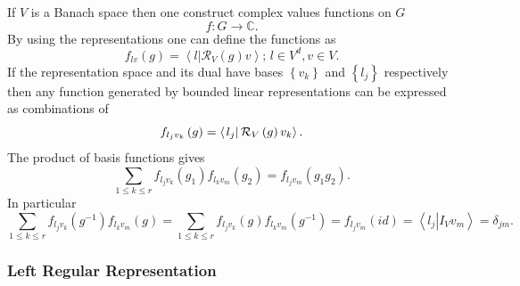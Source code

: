 \documentclass[aps,preprint]{revtex4}
\begin{document}
If $V$ is a Banach space then one construct complex values functions on $G$ 
\begin{equation}
f:G\rightarrow \mathbb{C}.
\end{equation}%
By using the representations one can define the functions as 
\begin{equation}
f_{lv}\left( g\right) =\left\langle \left. l\right\vert \mathcal{R}%
_{V}\left( g\right) v\right\rangle ;\,l\in V^{d},v\in V.
\end{equation}%
If the representation space and its dual have bases $\left\{ v_{k}\right\} $%
and $\left\{ l_{j}\right\} $ respectively then any function generated by
bounded linear representations can be expressed as combinations of 
\begin{equation}
f_{l_{j}v_{k}}\left( g\right) =\left\langle \left. l_{j}\right\vert \mathcal{%
R}_{V}\left( g\right) v_{k}\right\rangle .
\end{equation}%
The product of basis functions gives 
\begin{equation}
\sum_{1\leq k\leq r}f_{l_{j}v_{k}}\left( g_{1}\right) f_{l_{k}v_{m}}\left(
g_{2}\right) =f_{l_{j}v_{m}}\left( g_{1}g_{2}\right) .
\end{equation}%
In particular 
\begin{equation}
\sum_{1\leq k\leq r}f_{l_{j}v_{k}}\left( g^{-1}\right) f_{l_{k}v_{m}}\left(
g\right) =\sum_{1\leq k\leq r}f_{l_{j}v_{k}}\left( g\right)
f_{l_{k}v_{m}}\left( g^{-1}\right) =f_{l_{j}v_{m}}\left( id\right)
=\left\langle \left. l_{j}\right\vert I_{V}v_{m}\right\rangle =\delta _{jm}.
\end{equation}

\subsubsection{Left Regular Representation}
\end{document}
